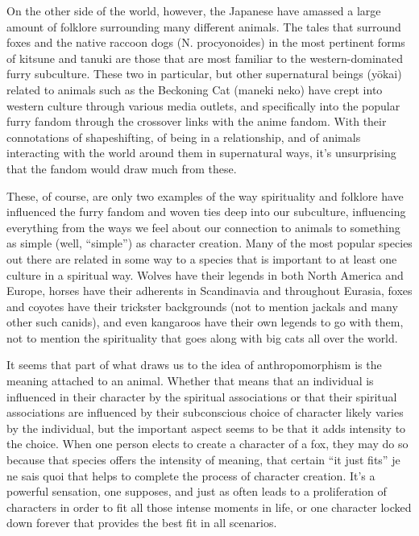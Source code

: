 On the other side of the world, however, the Japanese have amassed a large amount of folklore surrounding many different animals.  The tales that surround foxes and the native raccoon dogs (N. procyonoides) in the most pertinent forms of kitsune and tanuki are those that are most familiar to the western-dominated furry subculture.  These two in particular, but other supernatural beings (yōkai) related to animals such as the Beckoning Cat (maneki neko) have crept into western culture through various media outlets, and specifically into the popular furry fandom through the crossover links with the anime fandom.  With their connotations of shapeshifting, of being in a relationship, and of animals interacting with the world around them in supernatural ways, it's unsurprising that the fandom would draw much from these.

These, of course, are only two examples of the way spirituality and folklore have influenced the furry fandom and woven ties deep into our subculture, influencing everything from the ways we feel about our connection to animals to something as simple (well, ``simple'') as character creation.  Many of the most popular species out there are related in some way to a species that is important to at least one culture in a spiritual way.  Wolves have their legends in both North America and Europe, horses have their adherents in Scandinavia and throughout Eurasia, foxes and coyotes have their trickster backgrounds (not to mention jackals and many other such canids), and even kangaroos have their own legends to go with them, not to mention the spirituality that goes along with big cats all over the world.

It seems that part of what draws us to the idea of anthropomorphism is the meaning attached to an animal.  Whether that means that an individual is influenced in their character by the spiritual associations or that their spiritual associations are influenced by their subconscious choice of character likely varies by the individual, but the important aspect seems to be that it adds intensity to the choice.  When one person elects to create a character of a fox, they may do so because that species offers the intensity of meaning, that certain ``it just fits'' je ne sais quoi that helps to complete the process of character creation.  It's a powerful sensation, one supposes, and just as often leads to a proliferation of characters in order to fit all those intense moments in life, or one character locked down forever that provides the best fit in all scenarios.

